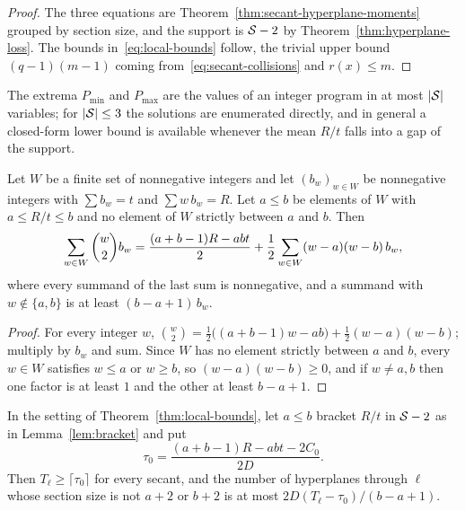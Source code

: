 \begin{proof}
The three equations are Theorem~\ref{thm:secant-hyperplane-moments}
grouped by section size, and the support is \(\mathcal S-2\) by
Theorem~\ref{thm:hyperplane-loss}.  The bounds
in~\eqref{eq:local-bounds} follow, the trivial upper bound
\((q-1)(m-1)\) coming from~\eqref{eq:secant-collisions} and
\(r(x)\le m\).
\end{proof}

The extrema \(P_{\min}\) and \(P_{\max}\) are the values of an integer
program in at most \(|\mathcal S|\) variables; for \(|\mathcal S|\le3\) the solutions
are enumerated directly, and in general a closed-form lower bound is
available whenever the mean \(R/t\) falls into a gap of the support.

\begin{lemma}
\label{lem:bracket}
Let \(W\) be a finite set of nonnegative integers and let \((b_w)_{w\in W}\)
be nonnegative integers with \(\sum b_w=t\) and \(\sum w\,b_w=R\).  Let
\(a\le b\) be elements of \(W\) with \(a\le R/t\le b\) and no element of
\(W\) strictly between \(a\) and \(b\).  Then
\begin{equation}
 \sum_{w\in W}\binom{w}{2}b_w
 =\frac{(a+b-1)R-abt}{2}+\frac12\sum_{w\in W}(w-a)(w-b)\,b_w,
\label{eq:bracket-identity}
\end{equation}
where every summand of the last sum is nonnegative, and a summand with
\(w\notin\{a,b\}\) is at least \((b-a+1)\,b_w\).
\end{lemma}

\begin{proof}
For every integer \(w\),
\(\binom{w}{2}=\tfrac12\bigl((a+b-1)w-ab\bigr)+\tfrac12(w-a)(w-b)\);
multiply by \(b_w\) and sum.  Since \(W\) has no element strictly between
\(a\) and \(b\), every \(w\in W\) satisfies \(w\le a\) or \(w\ge b\), so
\((w-a)(w-b)\ge0\), and if \(w\ne a,b\) then one factor is at least
\(1\) and the other at least \(b-a+1\).
\end{proof}

\begin{corollary}
\label{cor:closed-form}
In the setting of Theorem~\ref{thm:local-bounds}, let \(a\le b\) bracket
\(R/t\) in \(\mathcal S-2\) as in Lemma~\ref{lem:bracket} and put
\[
 \tau_0=\frac{(a+b-1)R-abt-2C_0}{2D}.
\]
Then \(T_\ell\ge\lceil\tau_0\rceil\) for every secant, and the number of
hyperplanes through \(\ell\) whose section size is not \(a+2\) or \(b+2\)
is at most \(2D(T_\ell-\tau_0)/(b-a+1)\).
\end{corollary}

